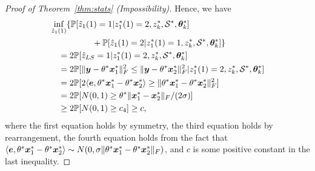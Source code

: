 \documentclass[journal]{IEEEtran}
\theoremstyle{definition}
\theoremstyle{definition}
\newcommand{\ang}[1]{\left\langle#1\right\rangle}
\begin{document}
\begin{proof}[Proof of Theorem~\ref{thm:stats} (Impossibility)]
   
   Hence, we have 
   \begin{align}
       & \inf_{\hat z_1(1)} \{ \bbP[\hat z_1(1) = 1| z_1^*(1) = 2, z^*_k, \tS^*, \mtheta^*_k] \\
       & \quad \quad \quad  \quad \quad  +   \bbP[\hat z_1(1) = 2| z_1^*(1) = 1, z^*_k, \tS^*, \mtheta^*_k] \} \\
       & \quad = 2 \bbP[ \hat z_{LS} = 1 |  z_1^*(1) = 2, z^*_k, \tS^*, \mtheta^*_k ] \\
      & \quad  = 2 \bbP[ \onormSize{}{\my - \theta^* \mx_1^*}_F^2 \leq \onormSize{}{\my - \theta^* \mx_2^*}_F^2 | z_1^*(1) = 2, z^*_k, \tS^*, \mtheta^*_k   ]\\
      & \quad = 2 \bbP [ 2 \langle \me, \theta^* \mx_1^* - \theta^*\mx_2^* \rangle \geq  \onormSize{}{\theta^* \mx_1^* - \theta^*\mx_2^*}_F^2 ]\\
       & \quad =  2 \bbP[ N(0,1) \geq \theta^* \onormSize{}{\mx_1^* - \mx_2^*}_F /(2\sigma) ] \\
       & \quad \geq 2 \bbP[ N(0,1) \geq c_4 ]   \geq c, \label{eq:inf}
   \end{align}
where the first equation holds by symmetry, the third equation holds by rearrangement, the fourth equation holds from the fact that $\ang{\me, \theta^* \mx_1^* - \theta^*\mx_2^* } \sim N(0, \sigma \onormSize{}{\theta^* \mx_1^* - \theta^*\mx_2^*}_F)$, and $c$ is some positive constant in the last inequality.
   

\end{proof}
\end{document}
